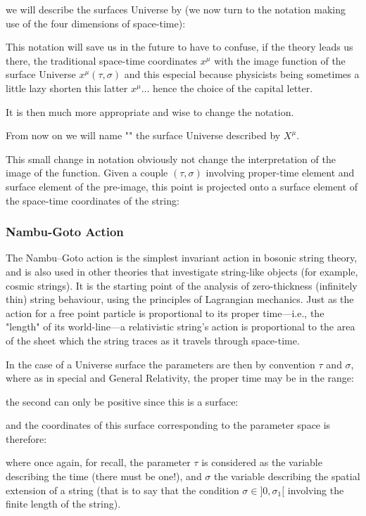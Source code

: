 	we will describe the surfaces Universe by (we now turn to the notation making use of the four dimensions of space-time):
	
	This notation will save us in the future to have to confuse, if the theory leads us there, the traditional space-time coordinates $x^\mu$ with the image function of the surface Universe $x^\mu(\tau,\sigma)$  and this especial because physicists being sometimes a little lazy shorten this latter $x^\mu$... hence the choice of the capital letter.
	
	It is then much more appropriate and wise to change the notation.
	
	From now on we will name "" the surface Universe described by $X^\mu$.
	
	This small change in notation obviously not change the interpretation of the image of the function. Given a couple $(\tau,\sigma)$ involving proper-time element and surface element of the pre-image, this point is projected onto a surface element of the space-time coordinates of the string:
	
	
	\subsubsection{Nambu-Goto Action}
	The Nambu–Goto action is the simplest invariant action in bosonic string theory, and is also used in other theories that investigate string-like objects (for example, cosmic strings). It is the starting point of the analysis of zero-thickness (infinitely thin) string behaviour, using the principles of Lagrangian mechanics. Just as the action for a free point particle is proportional to its proper time—i.e., the "length" of its world-line—a relativistic string's action is proportional to the area of the sheet which the string traces as it travels through space-time.
	
	In the case of a Universe surface the parameters are then by convention $\tau$ and $\sigma$, where as in special and General Relativity, the proper time may be in the range:
	
	the second can only be positive since this is a surface:
	
	and the coordinates of this surface corresponding to the parameter space is therefore:
	
	where once again, for recall, the parameter $\tau$ is considered as the variable describing the time (there must be one!), and $\sigma$ the variable describing the spatial extension of a string (that is to say that the condition $\sigma\in]0,\sigma_1[$ involving the finite length of the string).


